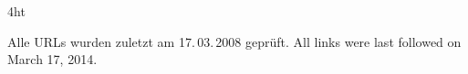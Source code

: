 \documentclass[
               paper=a4,
               BCOR1.92mm,DIV12,headinclude, %
               titlepage,
               bibliography=totoc,
               headsepline,
               cleardoublepage=empty,
               parskip=half,
	       pointlessnumbers, %
               final   %
               ]{scrreprt}
\let\ifdeutsch\iffalse
\begin{document}
\cleardoublepage

\iftex4ht
\else
\fi


\renewcommand*{\chapterpagestyle}{scrplain}
\pagestyle{scrheadings}

%
%
%







%
%
%
%
\appendix
%
%
\ifdeutsch
\else
\fi

\ifdeutsch
Alle URLs wurden zuletzt am 17.\,03.\,2008 geprüft.
\else
All links were last followed on March 17, 2014.
\fi

\pagestyle{empty}
\renewcommand*{\chapterpagestyle}{empty}
\Versicherung
\end{document}
